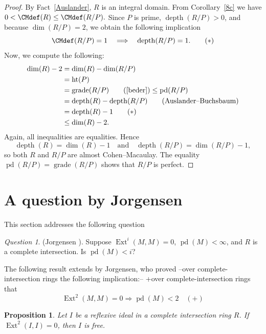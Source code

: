 \documentclass[11.05pt,a4paper]{amsart}
\newtheorem{proposition}[theorem]{Proposition}
\theoremstyle{definition}
\theoremstyle{remark}
\newtheorem{question}[theorem]{Question}
\newcommand{\grade}{\operatorname{grade}}
\newcommand{\pd}{\operatorname{pd}}
\newcommand{\Ext}{\operatorname{Ext}}
\newcommand{\depth}{\operatorname{depth}}
\begin{document}
\begin{proof}
	By Fact~\ref{Auslander}, $R$ is an integral domain. From Corollary~\ref{8c} we have
	\(
	0 < \CMdef(R) \le \CMdef(R/P).
	\)
	Since $P$ is prime, $\depth(R/P) > 0$, and because $\dim(R/P)=2$, we obtain the following implication
	\[
	\CMdef(R/P) = 1 \quad \Longrightarrow \quad \depth(R/P) = 1. \tag{$\ast$}
	\]
Now, we compute the following:
	\begin{align*}
	\dim(R) - 2
	&= \dim(R) - \dim(R/P) \\
	&= \operatorname{ht}(P) \\
	&= \grade(R/P) \tag{\ref{beder}}\le \pd(R/P) \\
	&= \depth(R) - \depth(R/P) \tag{Auslander–Buchsbaum}\\
	&= \depth(R) - 1 \tag{$\ast$}\\
	&\le \dim(R) - 2.
	\end{align*}
	Again, all inequalities are equalities. Hence
	\[
	\depth(R) = \dim(R) - 1 \quad \text{and} \quad \depth(R/P) = \dim(R/P) - 1,
	\]
	so both $R$ and $R/P$ are almost Cohen–Macaulay. The equality
	\(
	\pd(R/P) = \grade(R/P)
	\)
	shows that $R/P$ is perfect.
\end{proof}
\medskip
\section{A question by Jorgensen}

This section {addresses the following question}

\begin{question}(Jorgensen \cite[Question 2.7]{Jo}).
	Suppose $\Ext^i(M,M) = 0$, $\pd(M) < \infty$, and $R$ is a complete intersection. Is $\pd(M) < i$?
\end{question}

The following result extends \cite[Proposition 2.5]{Jo} by Jorgensen, who proved {–over complete-intersection rings the following implication:–} {+over complete-intersection rings that}
$$\Ext^2(M,M)=0\Rightarrow \pd(M)<2\quad(+)$$

\begin{proposition}
Let $I$ be  a reflexive ideal
in a complete intersection ring $R$. If $\Ext^2(I,I) = 0$,   then $I$ is free.
\end{proposition}
\end{document}
